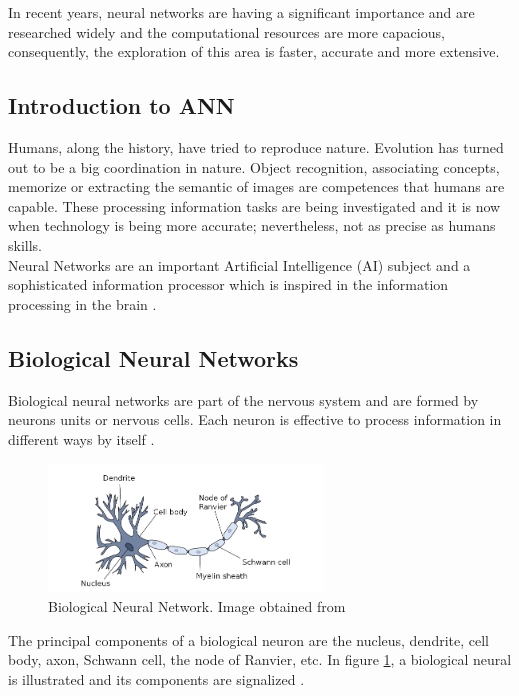 In recent years, neural networks are having a significant importance and are researched widely and the computational resources are more capacious, consequently, the exploration of this area is faster, accurate and more extensive.\\

\subsection{Introduction to ANN}
Humans, along the history, have tried to reproduce nature. Evolution has turned out to be a big coordination in nature. Object recognition, associating concepts, memorize or extracting the semantic of images are competences that humans are capable. These processing information tasks are being investigated and it is now when technology is being more accurate; nevertheless, not as precise as humans skills.\\

Neural Networks are an important Artificial Intelligence (AI) subject and a sophisticated information processor which is inspired in the information processing in the brain \cite{Rojas}.\\

\subsection{Biological Neural Networks}
Biological neural networks are part of the nervous system and are formed by neurons units or nervous cells. Each neuron is effective to process information in different ways by itself \cite{Rojas}.\\

\begin{figure}[htb]
\centering
\includegraphics[width=0.65\textwidth]{images_miscelaneus/neuron.png}
\caption{Biological Neural Network. Image obtained from \cite{BINN}} \label{fig:Bio-Neuron}
\end{figure}

The principal components of a biological neuron are the nucleus, dendrite, cell body, axon, Schwann cell, the node of Ranvier, etc. In figure \ref{fig:Bio-Neuron}, a biological neural is illustrated and its components are signalized \cite{BINN}.\\

